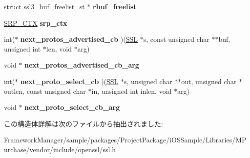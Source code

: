 \begin{DoxyCompactItemize}
\item 
\hypertarget{structssl__ctx__st_a5e371436a68dffc99cab280da6b8f65b}{}struct ssl3\+\_\+buf\+\_\+freelist\+\_\+st $\ast$ {\bfseries rbuf\+\_\+freelist}\label{structssl__ctx__st_a5e371436a68dffc99cab280da6b8f65b}

\item 
\hypertarget{structssl__ctx__st_a337f1046f4778a8835a72230f2c1f138}{}\hyperlink{structsrp__ctx__st}{S\+R\+P\+\_\+\+C\+T\+X} {\bfseries srp\+\_\+ctx}\label{structssl__ctx__st_a337f1046f4778a8835a72230f2c1f138}

\item 
\hypertarget{structssl__ctx__st_adb86f747421d5b58cf4bb5a49e2852bf}{}int($\ast$ {\bfseries next\+\_\+protos\+\_\+advertised\+\_\+cb} )(\hyperlink{structssl__st}{S\+S\+L} $\ast$s, const unsigned char $\ast$$\ast$buf, unsigned int $\ast$len, void $\ast$arg)\label{structssl__ctx__st_adb86f747421d5b58cf4bb5a49e2852bf}

\item 
\hypertarget{structssl__ctx__st_ac8a1f0523b26a16a16af4776041850f6}{}void $\ast$ {\bfseries next\+\_\+protos\+\_\+advertised\+\_\+cb\+\_\+arg}\label{structssl__ctx__st_ac8a1f0523b26a16a16af4776041850f6}

\item 
\hypertarget{structssl__ctx__st_a0064f01fff457ffcbd1182ddd51839b8}{}int($\ast$ {\bfseries next\+\_\+proto\+\_\+select\+\_\+cb} )(\hyperlink{structssl__st}{S\+S\+L} $\ast$s, unsigned char $\ast$$\ast$out, unsigned char $\ast$outlen, const unsigned char $\ast$in, unsigned int inlen, void $\ast$arg)\label{structssl__ctx__st_a0064f01fff457ffcbd1182ddd51839b8}

\item 
\hypertarget{structssl__ctx__st_ac7f01a164bb2f9ded179bd27940926bf}{}void $\ast$ {\bfseries next\+\_\+proto\+\_\+select\+\_\+cb\+\_\+arg}\label{structssl__ctx__st_ac7f01a164bb2f9ded179bd27940926bf}

\end{DoxyCompactItemize}


この構造体詳解は次のファイルから抽出されました\+:\begin{DoxyCompactItemize}
\item 
Framework\+Manager/sample/packages/\+Project\+Package/i\+O\+S\+Sample/\+Libraries/\+M\+Purchase/vendor/include/openssl/ssl.\+h\end{DoxyCompactItemize}
